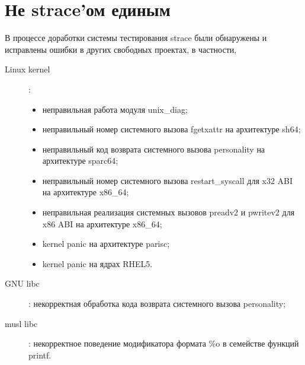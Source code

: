 \documentclass[10pt, a5paper]{article}
\begin{document}
\section*{Не strace'ом единым}
В процессе доработки системы тестирования strace были обнаружены и
исправлены ошибки в других свободных проектах, в частности,
\begin{description}
\item [Linux kernel]:
	\begin{itemize}
	\item неправильная работа модуля unix\_diag\cite{diag};
	\item неправильный номер системного вызова fgetxattr на архитектуре
	sh64\cite{sh64};
	\item неправильный код возврата системного вызова personality на
	архитектуре sparc64\cite{sparc64};
	\item неправильный номер системного вызова restart\_syscall для x32
	ABI на архитектуре x86\_64\cite{x32};
	\item неправильная реализация системных вызовов preadv2 и pwritev2
	для x86 ABI на архитектуре x86\_64\cite{x86};
	\item kernel panic на архитектуре parisc\cite{parisc};
	\item kernel panic на ядрах RHEL5.
	\end{itemize}
\item [GNU libc]: некорректная обработка кода возврата системного вызова
personality\cite{glibc};
\item [musl libc]: некорректное поведение модификатора формата \%o в семействе
функций printf\cite{musl}.
\end{description}
\end{document}
